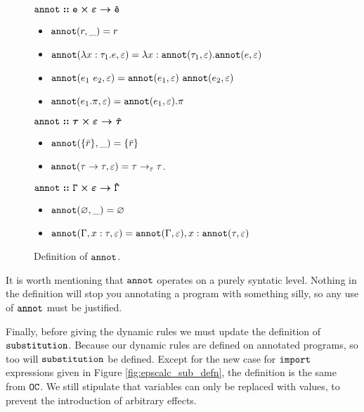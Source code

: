\begin{figure}[h]
\vspace{-5pt}

$\bm{\mathtt{annot :: e \times \varepsilon \rightarrow \hat e}}$

\begin{itemize}
	\setlength\itemsep{-0.7em}
	\item[] $\mathtt{annot}(r, \_) = r$
	\item[] $\mathtt{annot}(\lambda x: \tau_1 . e, \varepsilon) = \lambda x: \mathtt{annot}(\tau_1, \varepsilon) . \mathtt{annot}(e, \varepsilon)$
	\item[] $\mathtt{annot}(e_1~e_2, \varepsilon) = \mathtt{annot}(e_1, \varepsilon)~\mathtt{annot}(e_2, \varepsilon)$
	\item[] $\mathtt{annot}(e_1.\pi, \varepsilon) = \mathtt{annot}(e_1, \varepsilon).\pi$
\end{itemize}
	
$\bm{\mathtt{annot :: \tau \times \varepsilon \rightarrow \hat \tau}}$

\begin{itemize}
	\setlength\itemsep{-0.7em}
	\item[] $\mathtt{annot}(\{ \bar r \}, \_) = \{ \bar r \}$
	\item[] $\mathtt{annot}(\tau \rightarrow \tau, \varepsilon) = \tau \rightarrow_{\varepsilon} \tau$.	
\end{itemize}

$\bm{\mathtt{annot :: \Gamma \times \varepsilon \rightarrow \hat \Gamma}}$

\begin{itemize}
	\setlength\itemsep{-0.7em}
	\item[] $\mathtt{annot}(\varnothing, \_) = \varnothing$
	\item[] $\mathtt{annot}(\Gamma, x: \tau, \varepsilon) = \mathtt{annot}(\Gamma, \varepsilon), x: \mathtt{annot}(\tau, \varepsilon)$
\end{itemize}

\vspace{-7pt}
\caption{Definition of $\mathtt{annot}$.}
\label{fig:annot_defn}
\end{figure}

It is worth mentioning that $\mathtt{annot}$ operates on a purely syntatic level. Nothing in the definition will stop you annotating a program with something silly, so any use of $\mathtt{annot}$ must be justified.

Finally, before giving the dynamic rules we must update the definition of $\mathtt{substitution}$. Because our dynamic rules are defined on annotated programs, so too will $\mathtt{substitution}$ be defined. Except for the new case for $\mathtt{import}$ expressions given in Figure \ref{fig:epscalc_sub_defn}, the definition is the same from $\mathtt{OC}$. We still stipulate that variables can only be replaced with values, to prevent the introduction of arbitrary effects.

